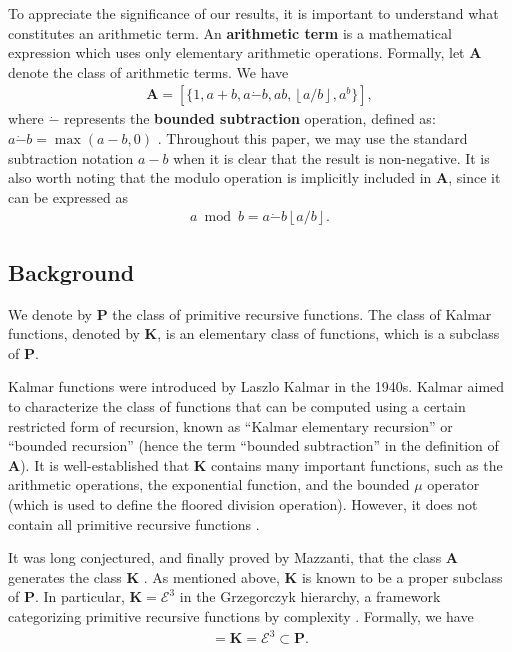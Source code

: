 \documentclass{article}
\theoremstyle{plain}
\theoremstyle{definition}
\newcommand{\floor}[1]{\left\lfloor #1 \right\rfloor}
\begin{document}
To appreciate the significance of our results, it is important to understand what constitutes an arithmetic term. An \textbf{arithmetic term} is a mathematical expression which uses only elementary arithmetic operations. Formally, let $\textbf{A}$ denote the class of arithmetic terms. We have
\begin{align*}
\textbf{A} = [ \{ 1, a+b, a\dot{-}b, ab, \floor{a/b}, a^b \} ],
\end{align*}
where $\dot{-}$ represents the \textbf{bounded subtraction} operation, defined as: $a \dot{-} b = \max(a-b,0)$ \cite{mazzanti2002plainbases}. Throughout this paper, we may use the standard subtraction notation $a-b$ when it is clear that the result is non-negative. It is also worth noting that the modulo operation is implicitly included in $\textbf{A}$, since it can be expressed as
\begin{align*}
a \bmod b = a \dot{-} b \floor{a/b}.
\end{align*}

\subsection{Background} \label{subsection:kalmar}
We denote by $\textbf{P}$ the class of primitive recursive functions. The class of Kalmar functions, denoted by $\textbf{K}$, is an elementary class of functions, which is a subclass of $\textbf{P}$.

Kalmar functions were introduced by Laszlo Kalmar in the 1940s. Kalmar aimed to characterize the class of functions that can be computed using a certain restricted form of recursion, known as ``Kalmar elementary recursion'' or ``bounded recursion'' (hence the term ``bounded subtraction'' in the definition of $\textbf{A}$). It is well-established that $\textbf{K}$ contains many important functions, such as the arithmetic operations, the exponential function, and the bounded $\mu$ operator (which is used to define the floored division operation). However, it does not contain all primitive recursive functions \cite{herman1969elementary}.

It was long conjectured, and finally proved by Mazzanti, that the class $\textbf{A}$ generates the class $\textbf{K}$ \cite{mazzanti2002plainbases, marchenkov2007superposition}. As mentioned above, $\textbf{K}$ is known to be a proper subclass of $\textbf{P}$. In particular, $\textbf{K} = \mathcal{E}^3$ in the Grzegorczyk hierarchy, a framework categorizing primitive recursive functions by complexity \cite{grzegorczyk1953someclasses}. Formally, we have
\begin{align*}
    [\textbf{A}] = \textbf{K} = \mathcal{E}^3 \subset \textbf{P} .
\end{align*}
\end{document}
